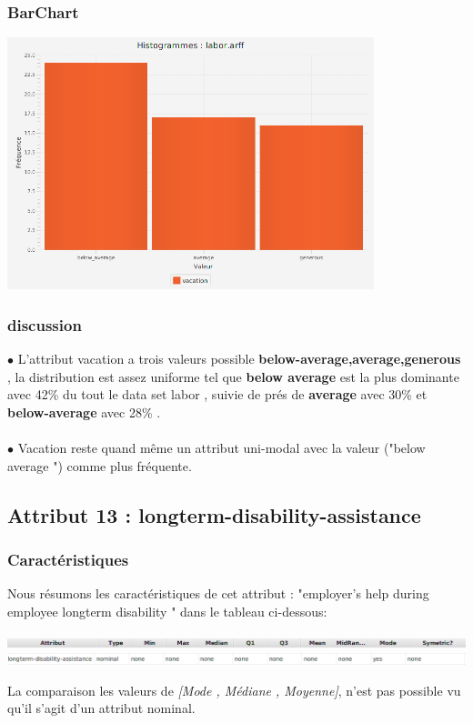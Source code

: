\documentclass[12pt,a4paper,oneside]{book}
\begin{document}
\subsubsection{BarChart}
\begin{center}
	\includegraphics[width=0.8\textwidth]{screens/barchart/vacation-barchart.png}%
	\label{labelname}%
\end{center}

\subsubsection{discussion}
$\bullet$ L'attribut vacation a trois valeurs possible \textbf{{below-average,average,generous}} , la distribution est assez uniforme  tel que  \textbf{below average} est la plus dominante avec  42\% du tout le data set labor , suivie de prés de \textbf{average} avec 30\% et \textbf{below-average} avec 28\% .\\
\textbf{ }\\
$\bullet$ Vacation reste quand même un attribut uni-modal avec la valeur ("below average ") comme plus fréquente.
  
  \newpage

\subsection{Attribut 13 : longterm-disability-assistance }
\subsubsection{Caractéristiques}
Nous résumons les caractéristiques de cet attribut : "employer's help during employee longterm disability " dans le tableau ci-dessous:
\begin{center}
	\includegraphics[width=1\textwidth]{screens/att.png}\\ \includegraphics[width=1\textwidth]{screens/att-14.png}%
	\label{labelname}%
\end{center}
La comparaison les valeurs de \textit{[Mode , Médiane , Moyenne]}, n'est pas possible vu qu'il s'agit d'un attribut nominal.
\end{document}
